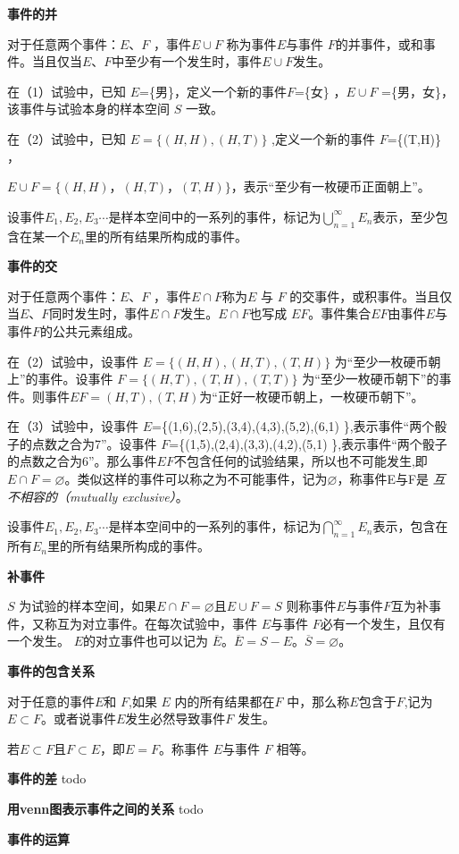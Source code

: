 \textbf{事件的并}

对于任意两个事件：$E$、$F$ ，事件$E\cup F$ 称为事件$E$与事件 $F$的并事件，或和事件。当且仅当$E$、$F$中至少有一个发生时，事件$E\cup F$发生。

在（1）试验中，已知 $E$=\{男\}，定义一个新的事件$F$=\{女\} ，$E\cup F$ =\{男，女\}，该事件与试验本身的样本空间 $S$ 一致。

在（2）试验中，已知 $E=\{(H,H),(H,T)\}$ ,定义一个新的事件 $F$=\{(T,H)\} ，

$E \cup F= \{(H,H)，(H,T)，(T,H)\}$，表示“至少有一枚硬币正面朝上”。

设事件$E_{1},E_{2},E_{3} \cdots $是样本空间中的一系列的事件，标记为$ \bigcup_{n=1}^{\infty } E_{n}$表示，至少包含在某一个$E_{n}$里的所有结果所构成的事件。\par\vspace{\baselineskip}


\textbf{事件的交}

对于任意两个事件：$E$、$F$ ，事件$E\cap F$称为$E$ 与 $F$ 的交事件，或积事件。当且仅当$E$、$F$同时发生时，事件$E\cap F$发生。$E\cap F$也写成 $EF$。事件集合$EF$由事件$E$与事件$F$的公共元素组成。

在（2）试验中，设事件 $E=\{(H,H),(H,T),(T,H)\}$ 为“至少一枚硬币朝上”的事件。设事件 $F=\{(H,T),(T,H),(T,T)\}$ 为“至少一枚硬币朝下”的事件。则事件$EF = {(H,T),(T,H)}$为“正好一枚硬币朝上，一枚硬币朝下”。

在（3）试验中，设事件 $E$=\{(1,6),(2,5),(3,4),(4,3),(5,2),(6,1) \},表示事件“两个骰子的点数之合为7”。设事件 $F$=\{(1,5),(2,4),(3,3),(4,2),(5,1) \},表示事件“两个骰子的点数之合为6”。那么事件$EF$不包含任何的试验结果，所以也不可能发生,即$E\cap F = \varnothing $。类似这样的事件可以称之为不可能事件，记为$ \varnothing$，称事件E与F是 \textit{互不相容的（mutually exclusive）}。

设事件$E_{1},E_{2},E_{3}\cdots$是样本空间中的一系列的事件，标记为$ \bigcap_{n=1}^{\infty } E_{n}$表示，包含在所有$E_{n}$里的所有结果所构成的事件。\par\vspace{\baselineskip}


\textbf{补事件}

$S$ 为试验的样本空间，如果$E\cap F = \varnothing $且$E\cup F = S $ 则称事件$E$与事件$F$互为补事件，又称互为对立事件。在每次试验中，事件 $E$与事件 $F$必有一个发生，且仅有一个发生。 $E$的对立事件也可以记为 $\overline{E}$。$\overline{E} = S-E$。$\overline{S}=\varnothing$。\par\vspace{\baselineskip}


\textbf{事件的包含关系}

对于任意的事件$E$和 $F$,如果 $E$ 内的所有结果都在$F$ 中，那么称$E$包含于$F$,记为$E \subset F$。或者说事件$E$发生必然导致事件$F$ 发生。

若$E \subset F$且$F \subset E$，即$E=F$。称事件 $E$与事件 $F$ 相等。\par\vspace{\baselineskip}

\textbf{事件的差}
todo


\textbf{用venn图表示事件之间的关系}
todo

\textbf{事件的运算}





